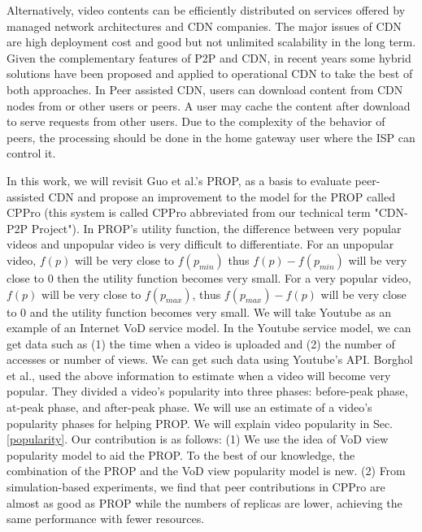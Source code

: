 \documentclass[10pt,final,journal,a4paper]{IEEEtran}
\begin{document}
Alternatively, video contents can be efficiently distributed on services offered by managed network architectures and CDN companies.
The major issues of CDN are high deployment cost and good but not unlimited scalability in the long term.  
Given the complementary features of P2P and CDN, in recent years some hybrid solutions have been proposed and applied to  operational  CDN \cite{Huang:2008:UHC:1496046.1496064,4772628,Yin:2009:DDH:1631272.1631279} to take the best of both approaches.
In Peer assisted CDN, users can download content from CDN nodes from or other users or peers. 
A user may cache the content after download to serve requests from other users. 
Due to the complexity of the behavior of peers, the processing should be done in the home gateway user where the ISP can control it.

In this work, we will revisit Guo et al.'s PROP, \cite{1613869} as a basis to evaluate peer-assisted CDN and propose an improvement to the model for the PROP called CPPro (this system is called CPPro abbreviated from our technical term "CDN-P2P Project").
In PROP's utility function, the difference between very popular videos and unpopular video is very difficult to differentiate. 
For an unpopular video, $f(p)$ will be very close to $f(p_{min})$ thus $f(p) - f(p_{min})$ will be very close to $0$ then the utility function becomes very small.
For a very popular video, $f(p)$ will be very close to $f(p_{max})$, thus $f(p_{max}) - f(p)$ will be very close to $0$ and the  utility function becomes very small.  
We will take Youtube as an example of an Internet VoD service model.
In the Youtube service model, we can get data such as (1) the time when a video is uploaded and (2) the number of accesses or number of views.
We can get such data using Youtube's API.
Borghol et al., \cite{Borghol:2011:CMP:2039452.2039717} used the above information to estimate when a video will become very popular.
They divided a video's popularity into three phases: before-peak phase, at-peak phase, and after-peak phase.
We will use an estimate of a video's popularity phases for helping PROP.
We will explain video popularity in Sec.\ref{popularity}.
Our contribution is as follows:
(1) We use the idea of VoD view popularity model to aid the PROP. 
To the best of our knowledge, the combination of the PROP and the VoD view popularity model is new.
(2) From simulation-based experiments, we find that peer contributions in CPPro are almost as good as  PROP while the numbers of replicas are lower, achieving the same performance with fewer resources.
\end{document}
